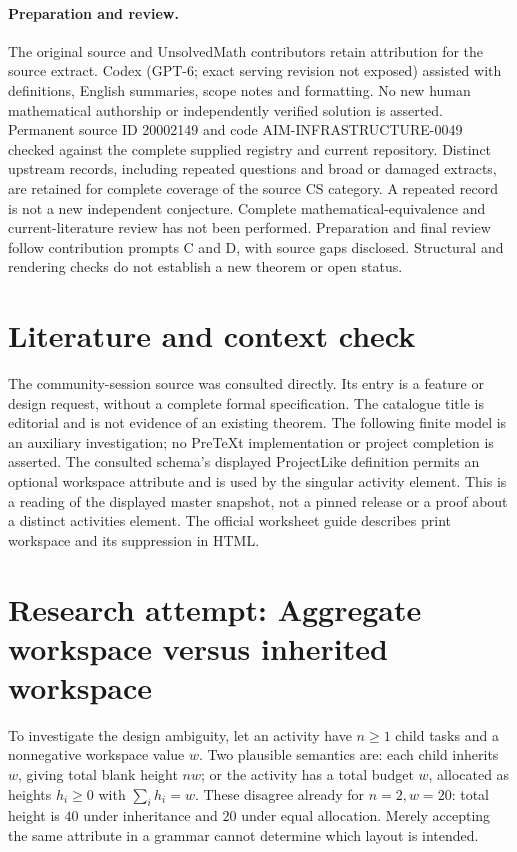 \documentclass[11pt]{article}
\begin{document}
\paragraph{Preparation and review.}
The original source and UnsolvedMath contributors retain attribution for the source extract. Codex (GPT-6; exact serving revision not exposed) assisted with definitions, English summaries, scope notes and formatting. No new human mathematical authorship or independently verified solution is asserted. Permanent source ID 20002149 and code AIM-INFRASTRUCTURE-0049 checked against the complete supplied registry and current repository. Distinct upstream records, including repeated questions and broad or damaged extracts, are retained for complete coverage of the source CS category. A repeated record is not a new independent conjecture. Complete mathematical-equivalence and current-literature review has not been performed. Preparation and final review follow contribution prompts C and D, with source gaps disclosed. Structural and rendering checks do not establish a new theorem or open status.
\label{end:20002149}

\section{Literature and context check}
The community-session source was consulted directly. Its entry is a feature or design request, without a complete formal specification. The catalogue title is editorial and is not evidence of an existing theorem. The following finite model is an auxiliary investigation; no PreTeXt implementation or project completion is asserted. The consulted schema's displayed ProjectLike definition permits an optional workspace attribute and is used by the singular activity element. This is a reading of the displayed master snapshot, not a pinned release or a proof about a distinct activities element. The official worksheet guide describes print workspace and its suppression in HTML.
\section{Research attempt: Aggregate workspace versus inherited workspace}
To investigate the design ambiguity, let an activity have $n\ge1$ child tasks and a nonnegative workspace value $w$. Two plausible semantics are: each child inherits $w$, giving total blank height $nw$; or the activity has a total budget $w$, allocated as heights $h_i\ge0$ with $\sum_i h_i=w$. These disagree already for $n=2,w=20$: total height is $40$ under inheritance and $20$ under equal allocation. Merely accepting the same attribute in a grammar cannot determine which layout is intended.
\end{document}
